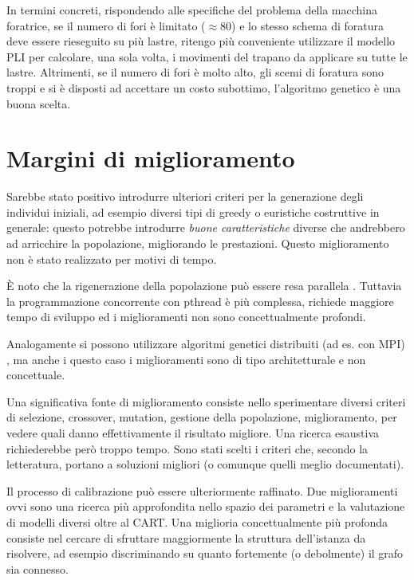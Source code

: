 \documentclass[a4paper, 10pt]{report}
\begin{document}
In termini concreti, rispondendo alle specifiche del problema della
macchina foratrice, se il numero di fori è limitato ($\approx 80$) e lo
stesso schema di foratura deve essere rieseguito su più lastre, ritengo
più conveniente utilizzare il modello PLI per calcolare, una sola volta,
i movimenti del trapano da applicare su tutte le lastre. Altrimenti, se il
numero di fori è molto alto, gli scemi di foratura sono troppi e si è
disposti ad accettare un costo subottimo, l'algoritmo genetico è una
buona scelta.



\section{Margini di miglioramento}
\label{sec:conclusion_improvement}
Sarebbe stato positivo introdurre ulteriori criteri per la generazione degli
individui iniziali, ad esempio diversi tipi di greedy o euristiche costruttive
in generale: questo potrebbe introdurre \emph{buone caratteristiche} diverse
che andrebbero ad arricchire la popolazione, migliorando le prestazioni.
Questo miglioramento non è stato realizzato per motivi di tempo.

È noto che la rigenerazione della popolazione può essere resa parallela \cite[Mühlenbein]{muhlenbein1991}.
Tuttavia la programmazione concorrente con pthread è più complessa, richiede
maggiore tempo di sviluppo ed i miglioramenti non sono concettualmente profondi.

Analogamente si possono utilizzare algoritmi genetici distribuiti (ad es. con
MPI) \cite[Braun]{braun1991}, ma anche i questo caso i miglioramenti sono di
tipo architetturale e non concettuale.

Una significativa fonte di miglioramento consiste nello sperimentare diversi
criteri di selezione, crossover, mutation, gestione della popolazione, miglioramento, per
vedere quali danno effettivamente il risultato migliore. Una ricerca esaustiva
richiederebbe però troppo tempo. Sono stati scelti i criteri che, secondo la
letteratura, portano a soluzioni migliori (o comunque quelli meglio documentati).

Il processo di calibrazione può essere ulteriormente raffinato. Due
miglioramenti ovvi sono una ricerca più approfondita nello spazio dei
parametri e la valutazione di modelli diversi oltre al CART. Una miglioria
concettualmente più profonda consiste nel cercare di sfruttare maggiormente
la struttura dell'istanza da risolvere, ad esempio discriminando su quanto
fortemente (o debolmente) il grafo sia connesso.
\end{document}
